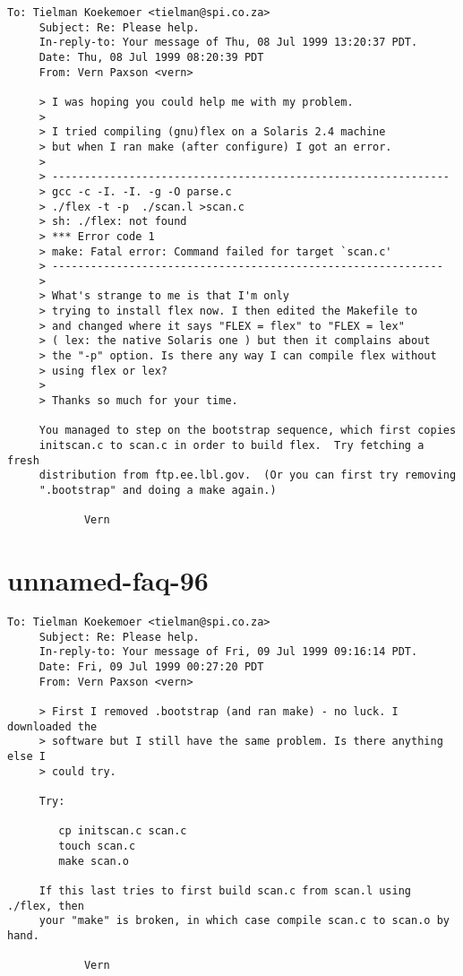 \documentclass[openany,oneside]{book}
\begin{document}
\begin{verbatim}
To: Tielman Koekemoer <tielman@spi.co.za>
     Subject: Re: Please help.
     In-reply-to: Your message of Thu, 08 Jul 1999 13:20:37 PDT.
     Date: Thu, 08 Jul 1999 08:20:39 PDT
     From: Vern Paxson <vern>
     
     > I was hoping you could help me with my problem.
     >
     > I tried compiling (gnu)flex on a Solaris 2.4 machine
     > but when I ran make (after configure) I got an error.
     >
     > --------------------------------------------------------------
     > gcc -c -I. -I. -g -O parse.c
     > ./flex -t -p  ./scan.l >scan.c
     > sh: ./flex: not found
     > *** Error code 1
     > make: Fatal error: Command failed for target `scan.c'
     > -------------------------------------------------------------
     >
     > What's strange to me is that I'm only
     > trying to install flex now. I then edited the Makefile to
     > and changed where it says "FLEX = flex" to "FLEX = lex"
     > ( lex: the native Solaris one ) but then it complains about
     > the "-p" option. Is there any way I can compile flex without
     > using flex or lex?
     >
     > Thanks so much for your time.
     
     You managed to step on the bootstrap sequence, which first copies
     initscan.c to scan.c in order to build flex.  Try fetching a fresh
     distribution from ftp.ee.lbl.gov.  (Or you can first try removing
     ".bootstrap" and doing a make again.)
     
     		Vern
\end{verbatim}

\section{unnamed-faq-96}

\begin{verbatim}
To: Tielman Koekemoer <tielman@spi.co.za>
     Subject: Re: Please help.
     In-reply-to: Your message of Fri, 09 Jul 1999 09:16:14 PDT.
     Date: Fri, 09 Jul 1999 00:27:20 PDT
     From: Vern Paxson <vern>
     
     > First I removed .bootstrap (and ran make) - no luck. I downloaded the
     > software but I still have the same problem. Is there anything else I
     > could try.
     
     Try:
     
     	cp initscan.c scan.c
     	touch scan.c
     	make scan.o
     
     If this last tries to first build scan.c from scan.l using ./flex, then
     your "make" is broken, in which case compile scan.c to scan.o by hand.
     
     		Vern
\end{verbatim}
\end{document}
